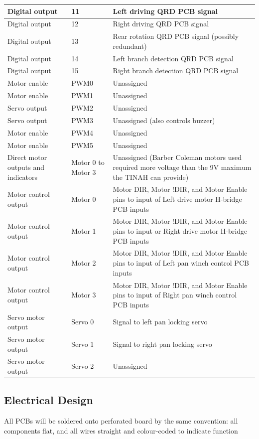 \documentclass[12pt]{article}
\begin{document}
\begin{longtable}{| L{7em} | L{3em} | L{25em} |}
\hline
Digital output & 11 & Left driving QRD PCB signal \\
\hline
Digital output & 12 & Right driving QRD PCB signal \\
\hline
Digital output & 13 & Rear rotation QRD PCB signal (possibly redundant) \\
\hline
Digital output & 14 & Left branch detection QRD PCB signal \\
\hline
Digital output & 15 & Right branch detection QRD PCB signal \\
\hline
Motor enable & PWM0 & Unassigned \\
\hline
Motor enable & PWM1 & Unassigned \\
\hline
Servo output & PWM2 & Unassigned \\
\hline
Servo output & PWM3 & Unassigned (also controls buzzer) \\
\hline
Motor enable & PWM4 & Unassigned \\
\hline
Motor enable & PWM5 & Unassigned \\
\hline
Direct motor outputs and indicators & Motor 0 to Motor 3 & Unassigned (Barber Coleman motors used required more voltage than the 9V maximum the TINAH can provide) \\
\hline
Motor control output & Motor 0 & Motor DIR, Motor !DIR, and Motor Enable pins to input of Left drive motor H-bridge PCB inputs \\
\hline
Motor control output & Motor 1 & Motor DIR, Motor !DIR, and Motor Enable pins to input or Right drive motor H-bridge PCB inputs \\
\hline
Motor control output & Motor 2 & Motor DIR, Motor !DIR, and Motor Enable pins to input of Left pan winch control PCB inputs \\
\hline
Motor control output & Motor 3 & Motor DIR, Motor !DIR, and Motor Enable pins to input of Right pan winch control PCB inputs \\
\hline
Servo motor output & Servo 0 & Signal to left pan locking servo \\
\hline
Servo motor output & Servo 1 & Signal to right pan locking servo \\
\hline
Servo motor output & Servo 2 & Unassigned \\
\hline
\end{longtable}
\subsection{Electrical Design}
All PCBs will be soldered onto perforated board by the same convention: all
components flat, and all wires straight and colour-coded to indicate function\\
\end{document}
